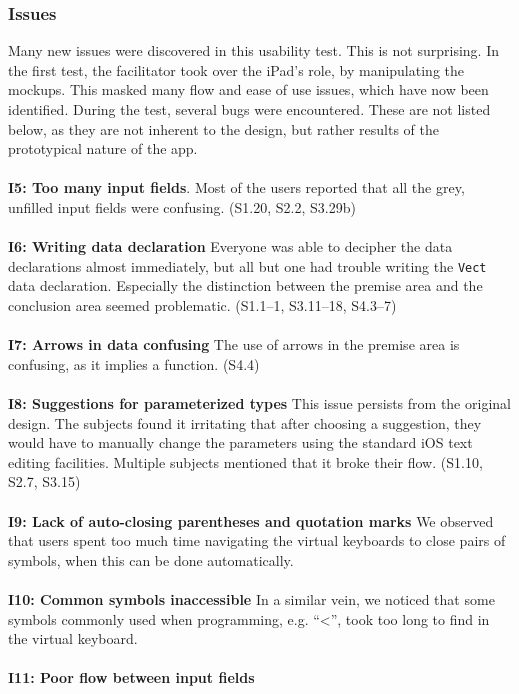 \subsubsection{Issues}
\label{sec:second_issues}
Many new issues were discovered in this usability test. This is not
surprising. In the first test, the facilitator took over the iPad's role, by
manipulating the mockups. This masked many flow and ease of use issues, which
have now been identified. During the test, several bugs were encountered. These
are not listed below, as they are not inherent to the design, but rather
results of the prototypical nature of the app.
\\ \\
\textbf{I5: Too many input fields}.
Most of the users reported that all the grey, unfilled input fields were
confusing. (S1.20, S2.2, S3.29b)
\\ \\
\textbf{I6: Writing data declaration}
Everyone was able to decipher the data declarations almost immediately, but
all but one had trouble writing the \texttt{Vect} data declaration. Especially
the distinction between the premise area and the conclusion area seemed
problematic. (S1.1--1, S3.11--18, S4.3--7)
\\ \\
\textbf{I7: Arrows in data confusing}
The use of arrows in the premise area is confusing, as it implies a function. 
(S4.4)
\\ \\
\textbf{I8: Suggestions for parameterized types}
This issue persists from the original design. The subjects found it irritating
that after choosing a suggestion, they would have to manually change the
parameters using the standard iOS text editing facilities. Multiple subjects
mentioned that it broke their flow. (S1.10, S2.7, S3.15)
\\ \\
\textbf{I9: Lack of auto-closing parentheses and quotation marks}
We observed that users spent too much time navigating the virtual keyboards to
close pairs of symbols, when this can be done automatically.
\\ \\
\textbf{I10: Common symbols inaccessible}
In a similar vein, we noticed that some symbols commonly used when programming,
e.g. ``<'', took too long to find in the virtual keyboard.
\\ \\
\textbf{I11: Poor flow between input fields}
